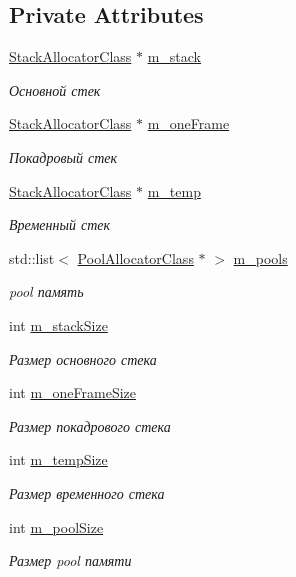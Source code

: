 \subsection*{Private Attributes}
\begin{DoxyCompactItemize}
\item 
\hyperlink{class_stack_allocator_class}{Stack\+Allocator\+Class} $\ast$ \hyperlink{class_memory_manager_class_acf7bbe0d477701f5f07984fa9bc3e3a6}{m\+\_\+stack}
\begin{DoxyCompactList}\small\item\em Основной стек \end{DoxyCompactList}\item 
\hyperlink{class_stack_allocator_class}{Stack\+Allocator\+Class} $\ast$ \hyperlink{class_memory_manager_class_a6f04dc821554c97dece250007a6f4ac5}{m\+\_\+one\+Frame}
\begin{DoxyCompactList}\small\item\em Покадровый стек \end{DoxyCompactList}\item 
\hyperlink{class_stack_allocator_class}{Stack\+Allocator\+Class} $\ast$ \hyperlink{class_memory_manager_class_a04ee9773635846f8de939d8d561137d1}{m\+\_\+temp}
\begin{DoxyCompactList}\small\item\em Временный стек \end{DoxyCompactList}\item 
std\+::list$<$ \hyperlink{class_pool_allocator_class}{Pool\+Allocator\+Class} $\ast$ $>$ \hyperlink{class_memory_manager_class_a53baae9ddc70c20a245bfbca9d5ba015}{m\+\_\+pools}
\begin{DoxyCompactList}\small\item\em pool память \end{DoxyCompactList}\item 
int \hyperlink{class_memory_manager_class_af84350d85df83ca5d37013ca1afa28d3}{m\+\_\+stack\+Size}
\begin{DoxyCompactList}\small\item\em Размер основного стека \end{DoxyCompactList}\item 
int \hyperlink{class_memory_manager_class_ad6ef63be90c4a851940df863d2ea7103}{m\+\_\+one\+Frame\+Size}
\begin{DoxyCompactList}\small\item\em Размер покадрового стека \end{DoxyCompactList}\item 
int \hyperlink{class_memory_manager_class_a95328b45da8d0823d1f4e5a0bc480cda}{m\+\_\+temp\+Size}
\begin{DoxyCompactList}\small\item\em Размер временного стека \end{DoxyCompactList}\item 
int \hyperlink{class_memory_manager_class_a6a0946aba11ac1d580bb67286109ff83}{m\+\_\+pool\+Size}
\begin{DoxyCompactList}\small\item\em Размер pool памяти \end{DoxyCompactList}\end{DoxyCompactItemize}
